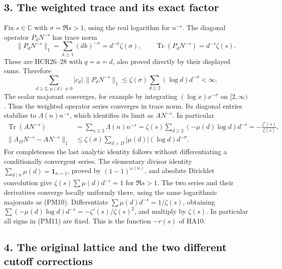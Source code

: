 \documentclass[
  10pt,
  a4paper,
]{article}
\begin{document}
\subsection{3. The weighted trace and its exact
factor}\label{the-weighted-trace-and-its-exact-factor}

Fix \(s\in\mathbb C\) with \(\sigma=\Re s>1\), using the real logarithm
for \(n^{-s}\). The diagonal operator \(P_dN^{-s}\) has trace norm \[
\|P_dN^{-s}\|_1=\sum_{k\ge1}(dk)^{-\sigma}
=d^{-\sigma}\zeta(\sigma),\qquad
\operatorname{Tr}(P_dN^{-s})=d^{-s}\zeta(s).
\tag{PM9}
\] These are HCR26--28 with \(q=a=d\), also proved directly by their
displayed sums. Therefore \[
\sum_{d\ge2,\,\mu(d)\ne0}|c_d|\,\|P_dN^{-s}\|_1
\le\zeta(\sigma)\sum_{d\ge2}(\log d)d^{-\sigma}<\infty.
\tag{PM10}
\] The scalar majorant converges, for example by integrating
\((\log x)x^{-\sigma}\) on \([2,\infty)\). Thus the weighted operator
series converges in trace norm. Its diagonal entries stabilize to
\(\Lambda(n)n^{-s}\), which identifies its limit as \(AN^{-s}\). In
particular \[
\begin{aligned}
\operatorname{Tr}(AN^{-s})
&=\sum_{n\ge2}\Lambda(n)n^{-s}
=\zeta(s)\sum_{d\ge2}(-\mu(d)\log d)d^{-s}
=-\frac{\zeta'(s)}{\zeta(s)},\\
\|A_DN^{-s}-AN^{-s}\|_1
&\le\zeta(\sigma)\sum_{d>D}|\mu(d)|(\log d)d^{-\sigma}.
\end{aligned}
\tag{PM11}
\] For completeness the last analytic identity follows without
differentiating a conditionally convergent series. The elementary
divisor identity \(\sum_{d\mid n}\mu(d)=\mathbf1_{n=1}\), proved by
\((1-1)^{\omega(n)}\), and absolute Dirichlet convolution give
\(\zeta(s)\sum\mu(d)d^{-s}=1\) for \(\Re s>1\). The two series and their
derivatives converge locally uniformly there, using the same logarithmic
majorants as (PM10). Differentiate \(\sum\mu(d)d^{-s}=1/\zeta(s)\),
obtaining \(\sum(-\mu(d)\log d)d^{-s}=-\zeta'(s)/\zeta(s)^2\), and
multiply by \(\zeta(s)\). In particular all signs in (PM11) are fixed.
This is the function \(-r(s)\) of HA10.

\subsection{4. The original lattice and the two different cutoff
corrections}\label{the-original-lattice-and-the-two-different-cutoff-corrections}
\end{document}
